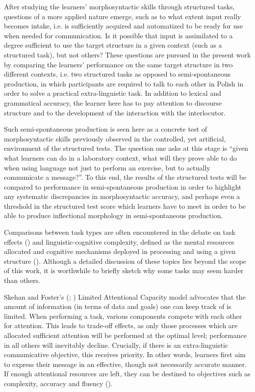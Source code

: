 After studying the learners’ morphosyntactic skills through structured tasks, questions of a more applied nature emerge, such as to what extent input really becomes intake, i.e. is sufficiently acquired and automatized to be ready for use when needed for communication. Is it possible that input is assimilated to a degree sufficient to use the target structure in a given context (such as a structured task), but not others? These questions are pursued in the present work by comparing the learners’ performance on the same target structure in two different contexts, i.e. two structured tasks as opposed to semi-spontaneous production, in which participants are required to talk to each other in Polish in order to solve a practical extra-linguistic task. In addition to lexical and grammatical accuracy, the learner here has to pay attention to discourse structure and to the development of the interaction with the interlocutor.

Such semi-spontaneous production is seen here as a concrete test of morphosyntactic skills previously observed in the controlled, yet artificial, environment of the structured tests. The question one asks at this stage is “given what learners can do in a laboratory context, what will they prove able to do when using language not just to perform an exercise, but to actually communicate a message?”. To this end, the results of the structured tests will be compared to performance in semi-spontaneous production in order to highlight any systematic discrepancies in morphosyntactic accuracy, and perhaps even a threshold in the structured test score which learners have to meet in order to be able to produce inflectional morphology in semi-spontaneous production. 

Comparisons between task types are often encountered in the debate on task effects (\citealt{RévészMichelEtAl2016, PlonskyKim2016, Sasayama2016}) and linguistic-cognitive complexity, defined as the mental resources allocated and cognitive mechanisms deployed in processing and using a given structure (\citealt{HousenSimoens2016}). Although a detailed discussion of these topics lies beyond the scope of this work, it is worthwhile to briefly sketch why some tasks may seem harder than others. 

Skehan and Foster’s (\citealt{Skehan2009}; \citealt{SkehanFoster2001}) Limited Attentional Capacity model advocates that the amount of information (in terms of data and goals) one can keep track of is limited. When performing a task, various components compete with each other for attention. This leads to trade-off effects, as only those processes which are allocated sufficient attention will be performed at the optimal level; performance in all others will inevitably decline. Crucially, if there is an extra-linguistic communicative objective, this receives priority. In other words, learners first aim to express their message in an effective, though not necessarily accurate manner. If enough attentional resources are left, they can be destined to objectives such as complexity, accuracy and fluency (\citealt{SkehanFoster2007}). 

